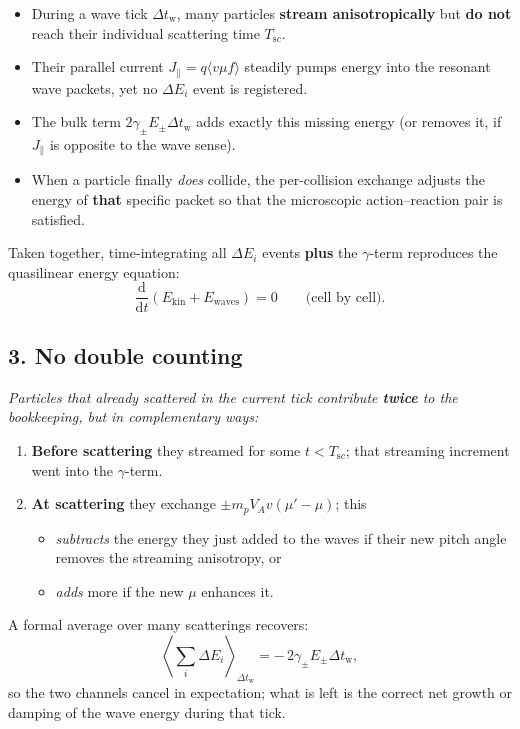 {\begin{itemize}
  \item During a wave tick $\Delta t_{\mathrm w}$, many particles \textbf{stream anisotropically} but \textbf{do not} reach their individual scattering time $T_{\mathrm sc}$.
  \item Their parallel current $J_{\parallel} = q \langle v\mu f \rangle$ steadily pumps energy into the resonant wave packets, yet no $\Delta E_i$ event is registered.
  \item The bulk term $2\gamma_\pm E_\pm \Delta t_{\mathrm w}$ adds exactly this missing energy (or removes it, if $J_{\parallel}$ is opposite to the wave sense).
  \item When a particle finally \emph{does} collide, the per-collision exchange adjusts the energy of \textbf{that} specific packet so that the microscopic action–reaction pair is satisfied.
\end{itemize}

Taken together, time-integrating all $\Delta E_i$ events \textbf{plus} the $\gamma$-term reproduces the quasilinear energy equation:
\[
\frac{\mathrm{d}}{\mathrm{d}t}\left(E_{\mathrm{kin}} + E_{\mathrm{waves}}\right) = 0
\qquad \text{(cell by cell).}
\]

\subsection*{3. No double counting}

\textit{Particles that already scattered in the current tick contribute \textbf{twice} to the bookkeeping, but in complementary ways:}

\begin{enumerate}
  \item \textbf{Before scattering} they streamed for some $t < T_{\mathrm sc}$; that streaming increment went into the $\gamma$-term.
  \item \textbf{At scattering} they exchange $\pm m_p V_A v (\mu' - \mu)$; this
  \begin{itemize}
    \item \emph{subtracts} the energy they just added to the waves if their new pitch angle removes the streaming anisotropy, or
    \item \emph{adds} more if the new $\mu$ enhances it.
  \end{itemize}
\end{enumerate}

A formal average over many scatterings recovers:
\[
\left\langle \sum_i \Delta E_i \right\rangle_{\Delta t_{\mathrm w}}
= -\,2\gamma_\pm E_\pm \Delta t_{\mathrm w},
\]
so the two channels cancel in expectation; what is left is the correct net growth or damping of the wave energy during that tick.

}
